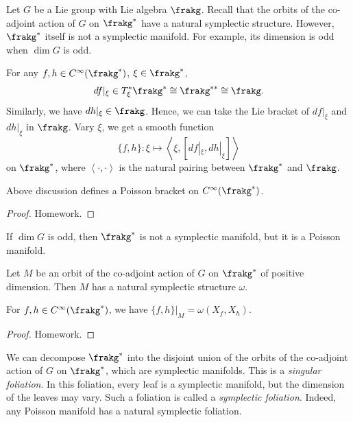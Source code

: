   Let $G$ be a Lie group with Lie algebra $\frakg$.
  Recall that the orbits of the co-adjoint action of $G$ on $\frakg^*$ have a natural symplectic structure.
  However, $\frakg^*$ itself is not a symplectic manifold.
  For example, its dimension is odd when $\dim G$ is odd.

  For any $f,h \in C^\infty(\frakg^*)$, $\xi \in \frakg^*$,
  \[ df |_\xi \in T_\xi^* \frakg^* \cong \frakg^{**} \cong \frakg. \]
  Similarly, we have $dh |_\xi \in \frakg$.
  Hence, we can take the Lie bracket of $df |_\xi$ and $dh |_\xi$ in $\frakg$.
  Vary $\xi$, we get a smooth function 
  \[ \{f,h\}: \xi \mapsto \left< \xi, [df |_\xi, dh |_\xi] \right> \]
  on $\frakg^*$, where $\left< \cdot, \cdot \right>$ is the natural pairing between $\frakg^*$ and $\frakg$.
 
  \begin{proposition}
    Above discussion defines a Poisson bracket on $C^\infty(\frakg^*)$.
  \end{proposition}
  \begin{proof}
    Homework.
  \end{proof}

  \begin{remark}
    If $\dim G$ is odd, then $\frakg^*$ is not a symplectic manifold, but it is a Poisson manifold.
  \end{remark}

  Let $M$ be an orbit of the co-adjoint action of $G$ on $\frakg^*$ of positive dimension.
  Then $M$ has a natural symplectic structure $\omega$.

  \begin{proposition}
    For $f,h \in C^\infty(\frakg^*)$, we have $\{f,h\} |_{M} = \omega(X_f, X_h)$.
  \end{proposition}
  \begin{proof}
    Homework.
  \end{proof}

  \begin{remark}
    We can decompose $\frakg^*$ into the disjoint union of the orbits of the co-adjoint action of $G$ on $\frakg^*$, which are symplectic manifolds.
    This is a \emph{singular foliation}.
    In this foliation, every leaf is a symplectic manifold, but the dimension of the leaves may vary.
    Such a foliation is called a \emph{symplectic foliation}.
    Indeed, any Poisson manifold has a natural symplectic foliation.
  \end{remark}

